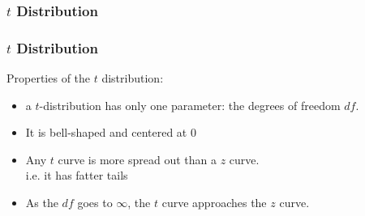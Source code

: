 \documentclass[handout]{beamer}
\newcommand{\blue}[1]{\textcolor{blue2}{#1}}
\begin{document}
\begin{frame}
\frametitle{$t$ Distribution}
%
%

\end{frame}


\begin{frame}
\frametitle{$t$ Distribution}
Properties of the $t$ distribution:

\begin{itemize}
\item a $t$-distribution has only one parameter: the \blue{degrees of freedom} $df$.
\pause \item It is bell-shaped and centered at 0
\pause \item Any $t$ curve is more spread out than a $z$ curve.\\
i.e. it has \blue{fatter tails}
\pause \item As the $df$ goes to $\infty$, the $t$ curve approaches the $z$ curve.
\end{itemize}

\end{frame}
\end{document}

